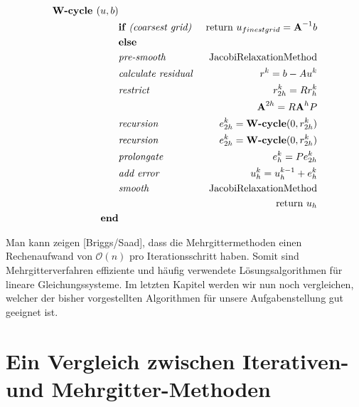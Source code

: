 \begin{eqnarray}
\textbf{W-cycle }(u,b)                         & \notag \\
&\textbf{if }\textit{(coarsest grid) }&\textnormal{return } u_{finest grid}={\textbf{A}}^{-1}b \notag \\
&\textbf{else }                                                & \notag \\
&\textit{pre-smooth }                                 &\textnormal{JacobiRelaxationMethod} \notag \\
&\textit{calculate residual }                &r^{k} = b - Au^{k} \notag \\
&\textit{restrict }                                 &r^{k}_{2h}=Rr^{k}_{h} \notag \\
&                                                                        &{\textbf{A}}^{2h} = R{\textbf{A}}^{h}P \notag \\
&\textit{recursion }                                &e^{k}_{2h} = \textbf{W-cycle}(0,r^{k}_{2h}) \notag \\
&\textit{recursion }                                &e^{k}_{2h} = \textbf{W-cycle}(0,r^{k}_{2h}) \notag \\
&\textit{prolongate }                                &e^{k}_{h} = Pe^{k}_{2h} \notag \\
&\textit{add error }                                &u^{k}_{h} = u^{k-1}_{h} + e^{k}_{h} \notag \\
&\textit{smooth }                                        &\textnormal{JacobiRelaxationMethod} \notag \\
&                                                                        &\textnormal{return } u_{h} \notag \\
\textbf{end}                                                & \notag
\end{eqnarray}

Man kann zeigen [Briggs/Saad], dass die Mehrgittermethoden einen Rechenaufwand von $\mathcal{O}(n)$ pro Iterationsschritt haben. Somit sind Mehrgitterverfahren effiziente und häufig verwendete Lösungsalgorithmen für lineare Gleichungssysteme. Im letzten Kapitel werden wir nun noch vergleichen, welcher der bisher vorgestellten Algorithmen für unsere Aufgabenstellung gut geeignet ist.

\chapter{Ein Vergleich zwischen Iterativen- und Mehrgitter-Methoden}\label{c.Vergleich}

